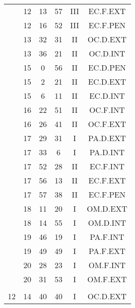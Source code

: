 \documentclass[12pt, a4paper]{article}
\begin{document}
\begin{multicols}{3}
{\begin{tabular}{c c c c c c}
	 	 	 	 & 12 & 13 & 57 & III & EC.F.EXT\\%
	 	 	 	 & 12 & 16 & 52 & III & EC.F.PEN\\%
	 	 	 	 & 13 & 32 & 31 & II & OC.D.EXT\\%
	 	 	 	 & 13 & 36 & 21 & II & OC.D.INT\\%
	 	 	 	 & 15 & 0 & 56 & II & EC.D.PEN\\%
	 	 	 	 & 15 & 2 & 21 & II & EC.D.EXT\\%
	 	 	 	 & 15 & 6 & 11 & II & EC.D.INT\\%
	 	 	 	 & 16 & 22 & 51 & II & OC.F.INT\\%
	 	 	 	 & 16 & 26 & 41 & II & OC.F.EXT\\%
	 	 	 	 & 17 & 29 & 31 & I & PA.D.EXT\\%
	 	 	 	 & 17 & 33 & 6 & I & PA.D.INT\\%
	 	 	 	 & 17 & 52 & 28 & II & EC.F.INT\\%
	 	 	 	 & 17 & 56 & 13 & II & EC.F.EXT\\%
	 	 	 	 & 17 & 57 & 38 & II & EC.F.PEN\\%
	 	 	 	 & 18 & 11 & 20 & I & OM.D.EXT\\%
	 	 	 	 & 18 & 14 & 55 & I & OM.D.INT\\%
	 	 	 	 & 19 & 46 & 19 & I & PA.F.INT\\%
	 	 	 	 & 19 & 49 & 49 & I & PA.F.EXT\\%
	 	 	 	 & 20 & 28 & 23 & I & OM.F.INT\\%
	 	 	 	 & 20 & 31 & 53 & I & OM.F.EXT\\%
	 	 	 	 & & & & & \\%
	 	 	 	12 & 14 & 40 & 40 & I & OC.D.EXT\\%
	 	 \end{tabular}
 	}
\end{multicols}
\end{document}
